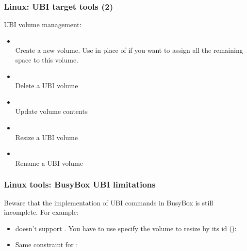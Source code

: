 \begin{frame}
  \frametitle{Linux: UBI target tools (2)}
  UBI volume management:
    \begin{itemize}
    \item {\small {}}\\
	Create a new volume. Use  in place of 
	if you want to assign all the remaining space to this volume.
    \item {\small {}}\\
	Delete a UBI volume
    \item {\small {}}\\
	Update volume contents
    \item {\small {}}\\
      	Resize a UBI volume
    \item {\small {}}\\
	Rename a UBI volume
    \end{itemize}
\end{frame}

\begin{frame}
  \frametitle{Linux tools: BusyBox UBI limitations}
  Beware that the implementation of UBI commands in BusyBox is still
  incomplete. For example:
  \begin{itemize}
    \item {} doesn't support . You have
      to use specify the volume to resize by its id ():\\
    \item Same constraint for :\\
    \end{itemize}
\end{frame} 

